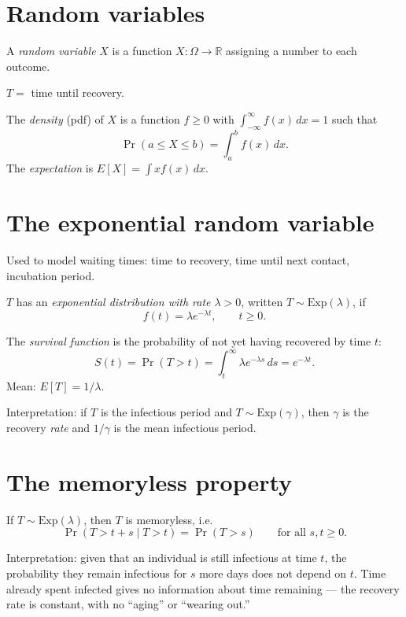 \section{Random variables}

\begin{definition}
A \emph{random variable} $X$ is a function $X:\Omega\to\mathbb{R}$ assigning a number to each outcome.
\end{definition}

\begin{example}
$T=$ time until recovery.
\end{example}

\begin{definition}
The \emph{density} (pdf) of $X$ is a function $f\ge 0$ with $\displaystyle\int_{-\infty}^\infty f(x)\,dx=1$ such that
\[
\Pr(a\le X\le b)=\int_a^b f(x)\,dx.
\]
The \emph{expectation} is $E[X]=\int x f(x)\,dx$.
\end{definition}

\section{The exponential random variable}

Used to model waiting times: time to recovery, time until next contact, incubation period.

\begin{definition}
$T$ has an \emph{exponential distribution with rate $\lambda>0$}, written $T\sim\text{Exp}(\lambda)$, if
\[
f(t)=\lambda e^{-\lambda t}, \qquad t\ge 0.
\]
\end{definition}

The \emph{survival function} is the probability of not yet having recovered by time $t$:
\[
S(t) = \Pr(T>t) = \int_t^\infty \lambda e^{-\lambda s}\,ds = e^{-\lambda t}.
\]
Mean: $E[T]=1/\lambda$.

Interpretation: if $T$ is the infectious period and $T\sim\text{Exp}(\gamma)$, then $\gamma$ is the recovery \emph{rate} and $1/\gamma$ is the mean infectious period.

\section{The memoryless property}
\begin{proposition}
  If $T\sim\text{Exp}(\lambda)$, then $T$ is memoryless, i.e.~
  \[
  \Pr(T> t+s \mid T> t) = \Pr(T> s) \qquad \text{for all } s,t\ge 0.
  \]
\end{proposition}
Interpretation: given that an individual is still infectious at time
$t$, the probability they remain infectious for $s$ more days does not
depend on $t$. Time already spent infected gives no information about
time remaining --- the recovery rate is constant, with no ``aging'' or
``wearing out.''

